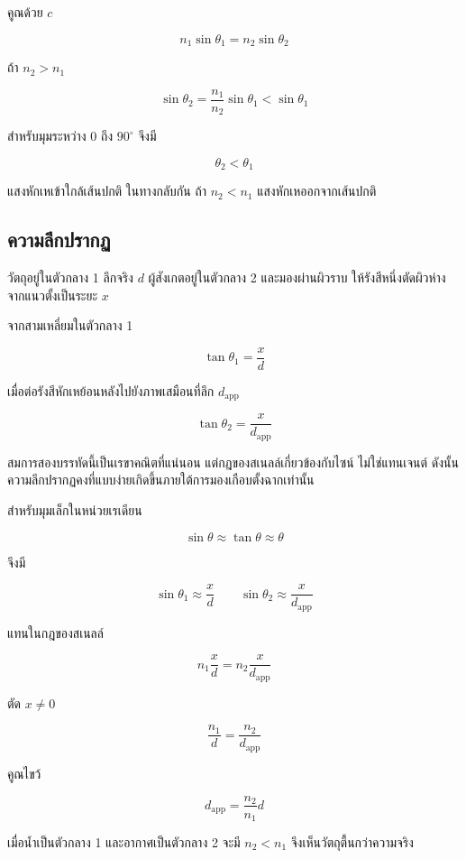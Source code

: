คูณด้วย $c$

\begin{tcolorbox}[title={กฎของสเนลล์}]
\[
\boxed{n_1\sin\theta_1=n_2\sin\theta_2}
\]
\end{tcolorbox}

ถ้า $n_2>n_1$

\[
\sin\theta_2=\frac{n_1}{n_2}\sin\theta_1<\sin\theta_1
\]

สำหรับมุมระหว่าง $0$ ถึง $90^\circ$ จึงมี

\[
\theta_2<\theta_1
\]

แสงหักเหเข้าใกล้เส้นปกติ ในทางกลับกัน ถ้า $n_2<n_1$ แสงหักเหออกจากเส้นปกติ

\subsection{ความลึกปรากฏ}

วัตถุอยู่ในตัวกลาง 1 ลึกจริง $d$ ผู้สังเกตอยู่ในตัวกลาง 2 และมองผ่านผิวราบ ให้รังสีหนึ่งตัดผิวห่างจากแนวตั้งเป็นระยะ $x$

จากสามเหลี่ยมในตัวกลาง 1

\[
\tan\theta_1=\frac{x}{d}
\]

เมื่อต่อรังสีหักเหย้อนหลังไปยังภาพเสมือนที่ลึก $d_{\text{app}}$

\[
\tan\theta_2=\frac{x}{d_{\text{app}}}
\]

สมการสองบรรทัดนี้เป็นเรขาคณิตที่แน่นอน แต่กฎของสเนลล์เกี่ยวข้องกับไซน์ ไม่ใช่แทนเจนต์ ดังนั้นความลึกปรากฏคงที่แบบง่ายเกิดขึ้นภายใต้การมองเกือบตั้งฉากเท่านั้น

สำหรับมุมเล็กในหน่วยเรเดียน

\[
\sin\theta\approx\tan\theta\approx\theta
\]

จึงมี

\[
\sin\theta_1\approx\frac{x}{d}
\qquad
\sin\theta_2\approx\frac{x}{d_{\text{app}}}
\]

แทนในกฎของสเนลล์

\[
n_1\frac{x}{d}
=
n_2\frac{x}{d_{\text{app}}}
\]

ตัด $x\ne0$

\[
\frac{n_1}{d}
=
\frac{n_2}{d_{\text{app}}}
\]

คูณไขว้

\begin{tcolorbox}[title={ความลึกปรากฏเมื่อมองเกือบตั้งฉาก}]
\[
\boxed{d_{\text{app}}=\frac{n_2}{n_1}d}
\]
\end{tcolorbox}

เมื่อน้ำเป็นตัวกลาง 1 และอากาศเป็นตัวกลาง 2 จะมี $n_2<n_1$ จึงเห็นวัตถุตื้นกว่าความจริง

